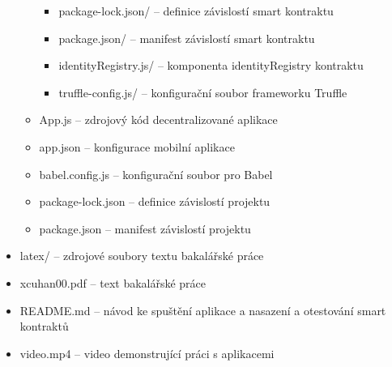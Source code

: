 \begin{itemize}
\begin{itemize}
\begin{itemize}
            \item package-lock.json/ -- definice závislostí smart kontraktu
            \item package.json/ -- manifest závislostí smart kontraktu
            \item identityRegistry.js/ -- komponenta identityRegistry kontraktu
            \item truffle-config.js/ -- konfigurační soubor frameworku Truffle
        \end{itemize}
        \item App.js -- zdrojový kód decentralizované aplikace
        \item app.json -- konfigurace mobilní aplikace
        \item babel.config.js -- konfigurační soubor pro Babel
        \item package-lock.json -- definice závislostí projektu
        \item package.json -- manifest závislostí projektu
    \end{itemize}
    \item latex/ -- zdrojové soubory textu bakalářské práce
    \item xcuhan00.pdf -- text bakalářské práce
    \item README.md -- návod ke spuštění aplikace a nasazení a otestování smart kontraktů
    \item video.mp4 -- video demonstrující práci s aplikacemi
\end{itemize}




%
